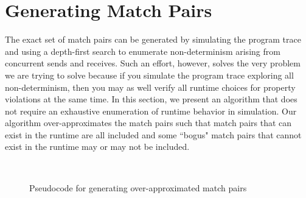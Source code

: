 \section{Generating Match Pairs}


The exact set of match pairs can be generated by simulating the program trace and using a depth-first search to enumerate non-determinism arising from concurrent sends and receives. Such an effort, however, solves the very problem we are trying to solve because if you simulate the program trace exploring all non-determinism, then you may as well verify all runtime choices for property violations at the same time. In this section, we present an algorithm that does not require an exhaustive enumeration of runtime behavior in simulation. Our algorithm over-approximates the match pairs such that match pairs that can exist in the runtime are all included and some ``bogus" match pairs that cannot exist in the runtime may or may not be included. %

\begin{figure}
\setlength{\tabcolsep}{20pt}
\begin{center}
\scalebox{0.7}{\usebox{\boxalgorithm}}\\
\end{center}
\caption{Pseudocode for generating over-approximated match pairs}
\label{fig:pseudocode}
\end{figure}

